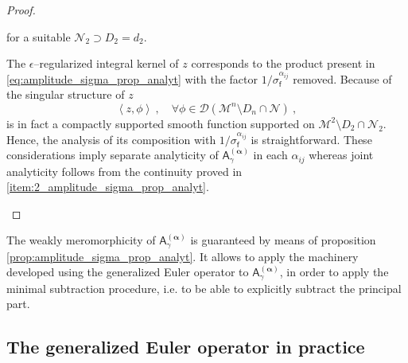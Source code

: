 \documentclass[11pt]{book}
\newcommand{\alphabd}{\boldsymbol{\alpha}}
\newcommand{\sm}[1]{\left\langle#1\right\rangle}
\newcommand{\Dcal}{\mathcal{D}}
\newcommand{\Mcal}{\mathcal{M}}
\newcommand{\Ncal}{\mathcal{N}}
\newcommand{\Asf}{\mathsf{A}}
\newcommand{\fsf}{\mathsf{f}}
\theoremstyle{break}
\begin{document}
\begin{proof}
\begin{description}
\begin{equation*}
\end{equation*}
%
for a suitable $\Ncal_2\supset D_2=d_2$. \par
%
The $\epsilon$--regularized integral kernel of $z$ corresponds to the product present in \eqref{eq:amplitude_sigma_prop_analyt} with the factor  $1/\sigma_\fsf^{\alpha_{ij}}$ removed. Because of the singular structure of $z$ 
%
\begin{equation*}
\sm{z,\phi} \ , \quad \forall \phi \in \Dcal\left(\Mcal^{n}\setminus D_{n}\cap \Ncal\right) \ ,  
\end{equation*}
%
is in fact a compactly supported smooth function supported on $\Mcal^{2}\setminus D_2\cap \Ncal_2$. Hence, the analysis of its composition with $1/\sigma_\fsf^{\alpha_{ij}}$ is straightforward. These considerations imply separate analyticity of $\Asf_\gamma^{(\alphabd)}$ in each $\alpha_{ij}$ whereas joint analyticity follows from the continuity proved in \ref{item:2_amplitude_sigma_prop_analyt}.
% 
\end{description}
\end{proof}


The weakly meromorphicity of $\Asf_\gamma^{(\alphabd)}$ is guaranteed by means of proposition \ref{prop:amplitude_sigma_prop_analyt}. It allows to apply the machinery developed using the generalized Euler operator to $\Asf_\gamma^{(\alphabd)}$, in order to apply the minimal subtraction procedure, i.e. to be able to explicitly subtract the principal part.


\subsection{The generalized Euler operator in practice}
\label{p:EULER_OP_PRACTICE}
\end{document}
